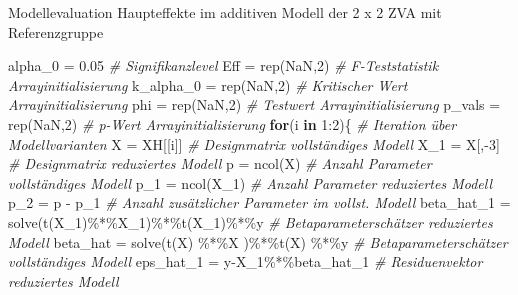 \documentclass[
  8pt,
  ignorenonframetext,
]{beamer}
\newenvironment{Shaded}{\begin{snugshade}}{\end{snugshade}}
\newcommand{\CommentTok}[1]{\textcolor[rgb]{0.56,0.35,0.01}{\textit{#1}}}
\newcommand{\ConstantTok}[1]{\textcolor[rgb]{0.00,0.00,0.00}{#1}}
\newcommand{\ControlFlowTok}[1]{\textcolor[rgb]{0.13,0.29,0.53}{\textbf{#1}}}
\newcommand{\DecValTok}[1]{\textcolor[rgb]{0.00,0.00,0.81}{#1}}
\newcommand{\FloatTok}[1]{\textcolor[rgb]{0.00,0.00,0.81}{#1}}
\newcommand{\FunctionTok}[1]{\textcolor[rgb]{0.00,0.00,0.00}{#1}}
\newcommand{\NormalTok}[1]{#1}
\newcommand{\OtherTok}[1]{\textcolor[rgb]{0.56,0.35,0.01}{#1}}
\newcommand{\SpecialCharTok}[1]{\textcolor[rgb]{0.00,0.00,0.00}{#1}}
\begin{document}
\begin{frame}[fragile]{\small Modellevaluation \textbar{} Haupteffekte
im additiven Modell der 2 x 2 ZVA mit Referenzgruppe}
\begin{Shaded}
\begin{Highlighting}[]
\NormalTok{alpha\_0    }\OtherTok{=} \FloatTok{0.05}                                        \CommentTok{\# Signifikanzlevel}
\NormalTok{Eff        }\OtherTok{=} \FunctionTok{rep}\NormalTok{(}\ConstantTok{NaN}\NormalTok{,}\DecValTok{2}\NormalTok{)                                  }\CommentTok{\# F{-}Teststatistik Arrayinitialisierung}
\NormalTok{k\_alpha\_0  }\OtherTok{=} \FunctionTok{rep}\NormalTok{(}\ConstantTok{NaN}\NormalTok{,}\DecValTok{2}\NormalTok{)                                  }\CommentTok{\# Kritischer Wert Arrayinitialisierung}
\NormalTok{phi        }\OtherTok{=} \FunctionTok{rep}\NormalTok{(}\ConstantTok{NaN}\NormalTok{,}\DecValTok{2}\NormalTok{)                                  }\CommentTok{\# Testwert Arrayinitialisierung}
\NormalTok{p\_vals     }\OtherTok{=} \FunctionTok{rep}\NormalTok{(}\ConstantTok{NaN}\NormalTok{,}\DecValTok{2}\NormalTok{)                                  }\CommentTok{\# p{-}Wert Arrayinitialisierung}
\ControlFlowTok{for}\NormalTok{(i }\ControlFlowTok{in} \DecValTok{1}\SpecialCharTok{:}\DecValTok{2}\NormalTok{)\{                                           }\CommentTok{\# Iteration über Modellvarianten}
\NormalTok{    X            }\OtherTok{=}\NormalTok{ XH[[i]]                               }\CommentTok{\# Designmatrix vollständiges Modell}
\NormalTok{    X\_1          }\OtherTok{=}\NormalTok{ X[,}\SpecialCharTok{{-}}\DecValTok{3}\NormalTok{]                                }\CommentTok{\# Designmatrix reduziertes Modell}
\NormalTok{    p            }\OtherTok{=} \FunctionTok{ncol}\NormalTok{(X)                               }\CommentTok{\# Anzahl Parameter vollständiges Modell}
\NormalTok{    p\_1          }\OtherTok{=} \FunctionTok{ncol}\NormalTok{(X\_1)                             }\CommentTok{\# Anzahl Parameter reduziertes Modell}
\NormalTok{    p\_2          }\OtherTok{=}\NormalTok{ p }\SpecialCharTok{{-}}\NormalTok{ p\_1                               }\CommentTok{\# Anzahl zusätzlicher Parameter im vollst. Modell}
\NormalTok{    beta\_hat\_1   }\OtherTok{=} \FunctionTok{solve}\NormalTok{(}\FunctionTok{t}\NormalTok{(X\_1)}\SpecialCharTok{\%*\%}\NormalTok{X\_1)}\SpecialCharTok{\%*\%}\FunctionTok{t}\NormalTok{(X\_1)}\SpecialCharTok{\%*\%}\NormalTok{y      }\CommentTok{\# Betaparameterschätzer reduziertes Modell}
\NormalTok{    beta\_hat     }\OtherTok{=} \FunctionTok{solve}\NormalTok{(}\FunctionTok{t}\NormalTok{(X) }\SpecialCharTok{\%*\%}\NormalTok{X )}\SpecialCharTok{\%*\%}\FunctionTok{t}\NormalTok{(X) }\SpecialCharTok{\%*\%}\NormalTok{y         }\CommentTok{\# Betaparameterschätzer vollständiges Modell}
\NormalTok{    eps\_hat\_1    }\OtherTok{=}\NormalTok{ y}\SpecialCharTok{{-}}\NormalTok{X\_1}\SpecialCharTok{\%*\%}\NormalTok{beta\_hat\_1                    }\CommentTok{\# Residuenvektor reduziertes Modell}

\end{Highlighting}
\end{Shaded}
\end{frame}
\end{document}

